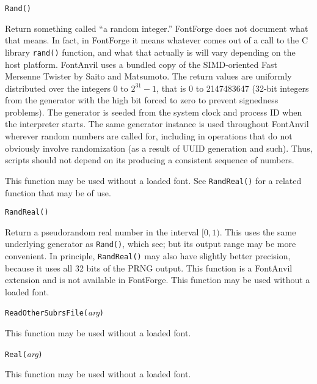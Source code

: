 \texttt{Rand()}

Return something called ``a random integer.''  FontForge \FFdiff does not
document what that means.  In fact, in FontForge it means whatever comes out
of a call to the C library \texttt{rand()} function, and what that actually
is will vary depending on the host platform.  FontAnvil uses a bundled copy
of the SIMD-oriented Fast Mersenne Twister by Saito and Matsumoto.  The
return values are uniformly distributed over the integers 0 to $2^{31}-1$,
that is 0 to 2147483647 (32-bit integers from the generator with the high
bit forced to zero to prevent signedness problems).  The generator is seeded
from the system clock and process ID when the interpreter starts.  The same
generator instance is used throughout FontAnvil wherever random numbers are
called for, including in operations that do not obviously involve
randomization (as a result of UUID generation and such).  Thus, scripts
should not depend on its producing a consistent sequence of numbers.

This function may be used without a loaded font.  See \texttt{RandReal()}
for a related function that may be of use.



\texttt{RandReal()}

Return a pseudorandom real number in the interval $[0,1)$.  This uses the
same underlying generator as \texttt{Rand()}, which see; but its output
range may be more convenient.  In principle, \texttt{RandReal()} may also
have slightly better precision, because it uses all 32 bits of the PRNG
output.  This \FFdiff function is a FontAnvil extension and is not available
in FontForge.  This function may be used without a loaded font.



\texttt{ReadOtherSubrsFile(}\textit{arg}\texttt{)}

This function may be used without a loaded font.



\texttt{Real(}\textit{arg}\texttt{)}

This function may be used without a loaded font.


